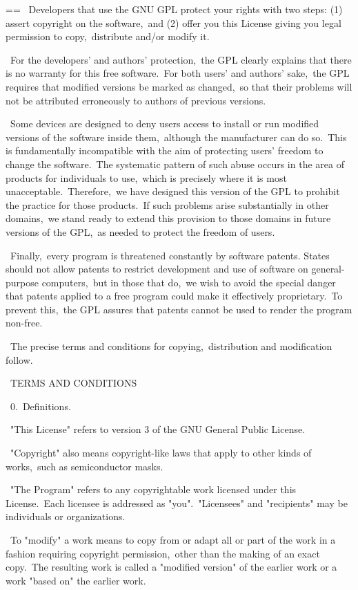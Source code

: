 \documentclass{book}
\makeatletter
\newenvironment{Texinfopreformatted}{%
  \par\GNUTobeylines\obeyspaces\frenchspacing\parskip=\z@\parindent=\z@}{}
{\catcode`\^^M=13 \gdef\GNUTobeylines{\catcode`\^^M=13 \def^^M{\null\par}}}
\newenvironment{Texinfoindented}{\begin{list}{}{}\item\relax}{\end{list}}
\renewcommand{\_}{\Texinfounderscore\discretionary{}{}{}}
\makeatother
\begin{document}
\begin{Texinfoindented}
\begin{Texinfopreformatted}
\  Developers that use the GNU GPL protect your rights with two steps:
(1) assert copyright on the software,\ and (2) offer you this License
giving you legal permission to copy,\ distribute and/or modify it.

\  For the developers' and authors' protection,\ the GPL clearly explains
that there is no warranty for this free software.\  For both users' and
authors' sake,\ the GPL requires that modified versions be marked as
changed,\ so that their problems will not be attributed erroneously to
authors of previous versions.

\  Some devices are designed to deny users access to install or run
modified versions of the software inside them,\ although the manufacturer
can do so.\  This is fundamentally incompatible with the aim of
protecting users' freedom to change the software.\  The systematic
pattern of such abuse occurs in the area of products for individuals to
use,\ which is precisely where it is most unacceptable.\  Therefore,\ we
have designed this version of the GPL to prohibit the practice for those
products.\  If such problems arise substantially in other domains,\ we
stand ready to extend this provision to those domains in future versions
of the GPL,\ as needed to protect the freedom of users.

\  Finally,\ every program is threatened constantly by software patents.
States should not allow patents to restrict development and use of
software on general-purpose computers,\ but in those that do,\ we wish to
avoid the special danger that patents applied to a free program could
make it effectively proprietary.\  To prevent this,\ the GPL assures that
patents cannot be used to render the program non-free.

\  The precise terms and conditions for copying,\ distribution and
modification follow.

\                       TERMS AND CONDITIONS

\  0.\ Definitions.

\  "This License" refers to version 3 of the GNU General Public License.

\  "Copyright" also means copyright-like laws that apply to other kinds of
works,\ such as semiconductor masks.

\  "The Program" refers to any copyrightable work licensed under this
License.\  Each licensee is addressed as "you".\  "Licensees" and
"recipients" may be individuals or organizations.

\  To "modify" a work means to copy from or adapt all or part of the work
in a fashion requiring copyright permission,\ other than the making of an
exact copy.\  The resulting work is called a "modified version" of the
earlier work or a work "based on" the earlier work.


\end{Texinfopreformatted}
\end{Texinfoindented}
\end{document}
